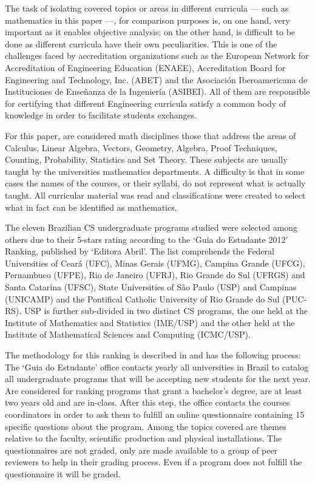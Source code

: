 \documentclass[conference]{IEEEtran}
\begin{document}
	The task of isolating covered topics or areas in different curricula — such as mathematics in this paper —, for comparison purposes is, on one hand, very important as it enables objective analysis; on the other hand, is difficult to be done as different curricula have their own peculiarities. This is one of the challenges faced by accreditation organizations such as the European Network for Accreditation of Engineering Education (ENAEE), Accreditation Board for Engineering and Technology, Inc. (ABET) and the Asociación Iberoamericana de Instituciones de Enseñanza de la Ingeniería (ASIBEI). All of them are responsible for certifying that different Engineering curricula satisfy a common body of knowledge in order to facilitate students exchanges.
	
	For this paper, are considered math disciplines those that address the areas of Calculus, Linear Algebra, Vectors, Geometry, Algebra, Proof Techniques, Counting, Probability, Statistics and Set Theory. These subjects are usually taught by the universities mathematics departments. A difficulty is that in some cases the names of the courses, or their syllabi, do not represent what is actually taught. All curricular material was read and classifications were created to select what in fact can be identified as mathematics.

	The eleven Brazilian CS undergraduate programs studied were selected among others due to their 5-stars rating according to the `Guia do Estudante 2012' Ranking, published by `Editora Abril'. \cite{guia_estudante} The list comprehends the Federal Universities of Ceará (UFC), Minas Gerais (UFMG), Campina Grande (UFCG), Pernambuco (UFPE), Rio de Janeiro (UFRJ), Rio Grande do Sul (UFRGS) and Santa Catarina (UFSC), State Universities of São Paulo (USP) and Campinas (UNICAMP) and the Pontifical Catholic University of Rio Grande do Sul (PUC-RS). USP is further sub-divided in two distinct CS programs, the one held at the Institute of Mathematics and Statistics (IME/USP) and the other held at the Institute of Mathematical Sciences and Computing (ICMC/USP).
	
	The methodology for this ranking is described in \cite{guia_estudante:metodologia} and has the following process: The `Guia do Estudante' office contacts yearly all universities in Brazil to catalog all undergraduate programs that will be accepting new students for the next year. Are considered for ranking programs that grant a bachelor's degree, are at least two years old and are in-class. After this step, the office contacts the courses coordinators in order to ask them to fulfill an online questionnaire containing 15 specific questions about the program. Among the topics covered are themes relative to the faculty, scientific production and physical installations. The questionnaires are not graded, only are made available to a group of peer reviewers to help in their grading process. Even if a program does not fulfill the questionnaire it will be graded.
\end{document}
